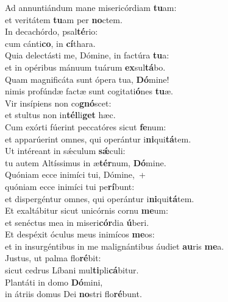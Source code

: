 \evenverse Ad annuntiándum mane misericórdiam \textbf{tu}am:~\*\\
\evenverse et veritátem \textbf{tu}am per \textbf{no}ctem.\\
\oddverse In decachórdo, psal\textbf{té}rio:~\*\\
\oddverse cum cánti\textbf{co}, in \textbf{cí}thara.\\
\evenverse Quia delectásti me, Dómine, in factúra \textbf{tu}a:~\*\\
\evenverse et in opéribus mánuum tuárum \textbf{ex}sul\textbf{tá}bo.\\
\oddverse Quam magnificáta sunt ópera tua, \textbf{Dó}mine!~\*\\
\oddverse nimis profúndæ factæ sunt cogitati\textbf{ó}nes \textbf{tu}æ.\\
\evenverse Vir insípiens non co\textbf{gnó}scet:~\*\\
\evenverse et stultus non in\textbf{tél}li\textbf{get} hæc.\\
\oddverse Cum exórti fúerint peccatóres sicut \textbf{fe}num:~\*\\
\oddverse et apparúerint omnes, qui operántur i\textbf{ni}qui\textbf{tá}tem.\\
\evenverse Ut intéreant in sǽculum \textbf{sǽ}culi:~\*\\
\evenverse tu autem Altíssimus in æ\textbf{tér}num, \textbf{Dó}mine.\\
\oddverse Quóniam ecce inimíci tui, Dómine,~+\\
\oddverse  quóniam ecce inimíci tui pe\textbf{rí}bunt:~\*\\
\oddverse et dispergéntur omnes, qui operántur i\textbf{ni}qui\textbf{tá}tem.\\
\evenverse Et exaltábitur sicut unicórnis cornu \textbf{me}um:~\*\\
\evenverse et senéctus mea in miseri\textbf{cór}dia \textbf{ú}beri.\\
\oddverse Et despéxit óculus meus inimícos \textbf{me}os:~\*\\
\oddverse et in insurgéntibus in me malignántibus áudiet \textbf{au}ris \textbf{me}a.\\
\evenverse Justus, ut palma flo\textbf{ré}bit:~\*\\
\evenverse sicut cedrus Líbani mul\textbf{ti}pli\textbf{cá}bitur.\\
\oddverse Plantáti in domo \textbf{Dó}mini,~\*\\
\oddverse in átriis domus Dei \textbf{no}stri flo\textbf{ré}bunt.\\
